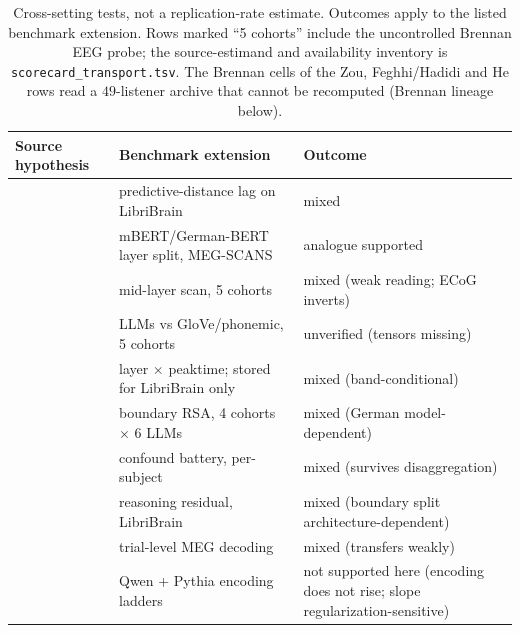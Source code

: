\documentclass{article}
\begin{document}
\begin{table}[t]
\centering
\small
\begin{tabular}{@{}p{3.6cm} p{4.1cm} p{3.4cm}@{}}
\toprule
Source hypothesis & Benchmark extension & Outcome \\
\midrule
\citet{caucheteux2023evidence} & predictive-distance lag on LibriBrain & mixed \\
\citet{bhayagrossman2025stg} & mBERT/German-BERT layer split, MEG-SCANS & analogue supported \\
\citet{toneva2019interpreting} & mid-layer scan, 5 cohorts & mixed (weak reading; ECoG inverts) \\
\citet{schrimpf2021neural} & LLMs vs GloVe/phonemic, 5 cohorts & unverified (tensors missing) \\
\citet{goldstein2025temporal} & layer $\times$ peaktime; stored for LibriBrain only & mixed (band-conditional) \\
\citet{zou2026constituent} & boundary RSA, 4 cohorts $\times$ 6 LLMs & mixed (German model-dependent) \\
\citet{feghhi2026spurious} & confound battery, per-subject & mixed (survives disaggregation) \\
\citet{he2025reasoning} & reasoning residual, LibriBrain & mixed (boundary split architecture-dependent) \\
\citet{tang2023semantic} & trial-level MEG decoding & mixed (transfers weakly) \\
\citet{antonello2024scaling} & Qwen + Pythia encoding ladders & not supported here (encoding does not rise; slope regularization-sensitive) \\
\bottomrule
\end{tabular}
\caption{Cross-setting tests, not a replication-rate estimate. Outcomes apply to the listed
benchmark extension. Rows marked ``5 cohorts'' include the uncontrolled Brennan EEG probe;
the source-estimand and availability inventory is \texttt{scorecard\_transport.tsv}. The Brennan
cells of the Zou, Feghhi/Hadidi and He rows read a $49$-listener archive that cannot be recomputed
(Brennan lineage below).}
\label{tab:scorecard}
\end{table}
\end{document}
